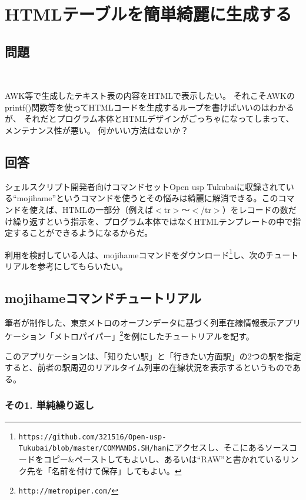 \section{HTMLテーブルを簡単綺麗に生成する}
\label{recipe:mojihame}

\subsection*{問題}
\noindent
$\!\!\!\!\!$
\begin{grshfboxit}{160.0mm}
	AWK等で生成したテキスト表の内容をHTMLで表示したい。
	それこそAWKのprintf()関数等を使ってHTMLコードを生成するループを書けばいいのはわかるが、
	それだとプログラム本体とHTMLデザインがごっちゃになってしまって、メンテナンス性が悪い。
	何かいい方法はないか？
\end{grshfboxit}

\subsection*{回答}
シェルスクリプト開発者向けコマンドセットOpen usp Tukubaiに収録されている``mojihame''というコマンドを使うとその悩みは綺麗に解消できる。このコマンドを使えば、HTMLの一部分（例えば$<$tr$>$～$<$/tr$>$）をレコードの数だけ繰り返すという指示を、プログラム本体ではなくHTMLテンプレートの中で指定することができるようになるからだ。

利用を検討している人は、mojihameコマンドをダウンロード\footnote{\verb|https://github.com/321516/Open-usp-Tukubai/blob/master/COMMANDS.SH/han|にアクセスし、そこにあるソースコードをコピー\&{}ペーストしてもよいし、あるいは``RAW''と書かれているリンク先を「名前を付けて保存」してもよい。}し、次のチュートリアルを参考にしてもらいたい。

\subsection*{mojihameコマンドチュートリアル}

筆者が制作した、東京メトロのオープンデータに基づく列車在線情報表示アプリケーション「メトロパイパー」\footnote{\verb|http://metropiper.com/|}を例にしたチュートリアルを記す。

このアプリケーションは、「知りたい駅」と「行きたい方面駅」の2つの駅を指定すると、前者の駅周辺のリアルタイム列車の在線状況を表示するというものである。

\subsubsection*{その1. 単純繰り返し}

